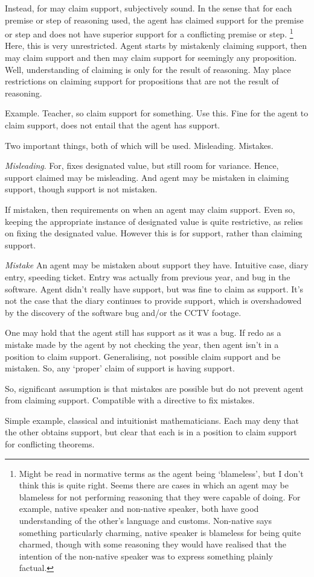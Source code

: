 \begin{note}[Support]
  Instead, for {may} claim support, subjectively sound.
  In the sense that for each premise or step of reasoning used, the agent has claimed support for the premise or step and does not have superior support for a conflicting premise or step.\nolinebreak
  \footnote{
    Might be read in normative terms as the agent being `blameless', but I don't think this is quite right.
    Seems there are cases in which an agent may be blameless for not performing reasoning that they were capable of doing.
    For example, native speaker and non-native speaker, both have good understanding of the other's language and customs.
    Non-native says something particularly charming, native speaker is blameless for being quite charmed, though with some reasoning they would have realised that the intention of the non-native speaker was to express something plainly factual.
  }
  Here, this is very unrestricted.
  Agent starts by mistakenly claiming support, then may claim support and then may claim support for seemingly any proposition.
  Well, understanding of claiming is only for the result of reasoning.
  May place restrictions on claiming support for propositions that are not the result of reasoning.

  Example.
  Teacher, so claim support for something.
  Use this.
  Fine for the agent to claim support, does not entail that the agent has support.

  Two important things, both of which will be used.
  Misleading.
  Mistakes.

  \emph{Misleading}.
  For, fixes designated value, but still room for variance.
  Hence, support claimed may be misleading.
  And agent may be mistaken in claiming support, though support is not mistaken.

  If mistaken, then requirements on when an agent may claim support.
  Even so, keeping the appropriate instance of designated value is quite restrictive, as relies on fixing the designated value.
  However this is for support, rather than claiming support.

  \emph{Mistake}
   An agent may be mistaken about support they have.
  Intuitive case, diary entry, speeding ticket.
  Entry was actually from previous year, and bug in the software.
  Agent didn't really have support, but was fine to claim as support.
  It's not the case that the diary continues to provide support, which is overshadowed by the discovery of the software bug and/or the CCTV footage.

  One may hold that the agent still has support as it was a bug.
  If redo as a mistake made by the agent by not checking the year, then agent isn't in a position to claim support.
  Generalising, not possible claim support and be mistaken.
  So, any `proper' claim of support is having support.

  So, significant assumption is that mistakes are possible but do not prevent agent from claiming support.
  Compatible with a directive to fix mistakes.

  Simple example, classical and intuitionist mathematicians.
  Each may deny that the other obtains support, but clear that each is in a position to claim support for conflicting theorems.
\end{note}


